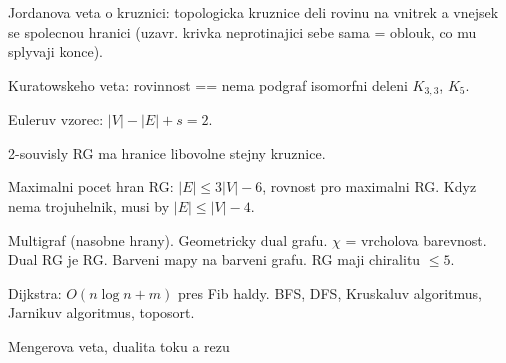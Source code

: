 Jordanova veta o kruznici: topologicka kruznice deli rovinu na vnitrek a vnejsek
se spolecnou hranici (uzavr. krivka neprotinajici sebe sama = oblouk, co mu
splyvaji konce).

Kuratowskeho veta: rovinnost == nema podgraf isomorfni deleni $K_{3,3}$, $K_5$.

Euleruv vzorec: $|V|-|E|+s=2$.

2-souvisly RG ma hranice libovolne stejny kruznice.

Maximalni pocet hran RG: $|E|\leq 3|V|-6$, rovnost pro maximalni RG.
Kdyz nema trojuhelnik, musi by $|E|\leq |V|-4$.

Multigraf (nasobne hrany).
Geometricky dual grafu.
$\chi$ = vrcholova barevnost.
Dual RG je RG.
Barveni mapy na barveni grafu.
RG maji chiralitu $\leq 5$.

Dijkstra: $O(n\log n+m)$ pres Fib haldy.
BFS, DFS, Kruskaluv algoritmus, Jarnikuv algoritmus, toposort.

Mengerova veta, dualita toku a rezu
